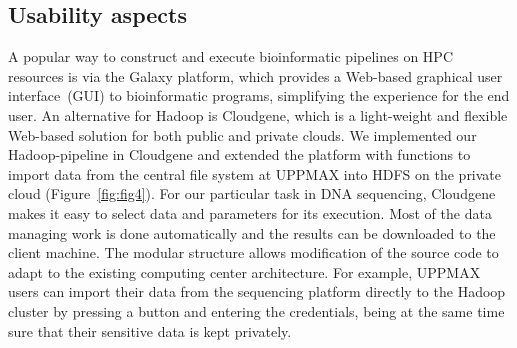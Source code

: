 \documentclass[11pt, oneside]{article}   	%
\begin{document}
\subsection{Usability aspects}
\label{subsectionIV_2}

A popular way to construct and execute bioinformatic pipelines on HPC resources is via the Galaxy\cite{galaxy} platform, which provides a Web-based graphical user interface~(GUI) to bioinformatic programs, simplifying the experience for the end user. 
An alternative for Hadoop is Cloudgene\cite{cloudgene}, which is a light-weight and flexible Web-based solution for both public and private clouds. We implemented our Hadoop-pipeline in Cloudgene and extended the platform with functions to import data from the central file system at UPPMAX into HDFS on the private cloud (Figure~\ref{fig:fig4}).
For our particular task in DNA sequencing, Cloudgene makes it easy to select data and parameters for its execution. Most of the data managing work is done automatically and the results can be downloaded to the client machine. The modular structure allows modification of the source code to adapt to the existing computing center architecture. For example, UPPMAX users can import their data from the sequencing platform directly to the Hadoop cluster by pressing a button and entering the credentials, being at the same time sure that their sensitive data is kept privately.
\end{document}
